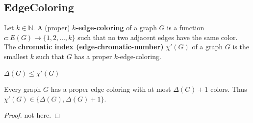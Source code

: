 \subsection{EdgeColoring}
\begin{definition}\label{5.25}
    Let $k\in\mathbb{N}$. A (proper) \textbf{$k$-edge-coloring} of a graph $G$ is a function $c:E(G)\to\{1,2,\ldots,k\}$ such that no two adjacent edges have the same color.\\
    The \textbf{chromatic index (edge-chromatic-number)} $\chi'(G)$ of a graph $G$ is the smallest $k$ such that $G$ has a proper $k$-edge-coloring.
\end{definition}
\begin{remark}\label{5.26}
    $\Delta(G)\leq \chi'(G)$
\end{remark}
\begin{theorem}\label{5.27}
    Every graph $G$ has a proper edge coloring with at most $\Delta(G)+1$ colors. Thus $\chi'(G)\in\{\Delta(G),\Delta(G)+1\}$.
\end{theorem}
\begin{proof}
    not here.
\end{proof}